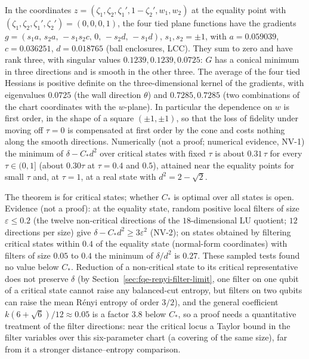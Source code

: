\begin{remark}\label{rem:fqe-critical-structure}
In the coordinates $z=(\zeta_1,\zeta_2,\zeta_1',1-\zeta_2',w_1,w_2)$ at the equality point with $(\zeta_1,\zeta_2,\zeta_1',\zeta_2')=(0,0,0,1)$, the four tied
plane functions have the gradients $g=(s_1a,\,s_2a,\,-s_1s_2c,\,0,\,-s_2d,\,-s_1d)$, $s_1,s_2=\pm1$, with
$a=0.059039$, $c=0.036251$, $d=0.018765$ (ball enclosures, LCC).  They sum to zero and have rank three, with singular values
$0.1239,0.1239,0.0725$: $G$ has a conical minimum in three directions and is smooth in the other three.  The average of the
four tied Hessians is positive definite on the three-dimensional kernel of the gradients, with eigenvalues
$0.0725$ (the wall direction $\theta$) and $0.7285,0.7285$ (two combinations of the chart coordinates with the $w$-plane).
In particular the dependence on $w$ is first order, in the shape of a square $(\pm1,\pm1)$, so that the loss of
fidelity under moving off $\tau=0$ is compensated at first order by the cone and costs nothing along the smooth directions.
Numerically (not a proof; numerical evidence, NV-1) the minimum of $\delta-C_*d^2$ over critical states with fixed
$\tau$ is about $0.31\,\tau$ for every $\tau\in(0,1]$ (about $0.30\tau$ at $\tau=0.4$ and $0.5$), attained near the equality points for small $\tau$ and,
at $\tau=1$, at a real state with $d^2=2-\sqrt2$.
\end{remark}

\begin{remark}\label{rem:fqe-critical-noncritical}
The theorem is for critical states; whether $C_*$ is optimal over all states is open.  Evidence (not a proof):
at the equality state, random positive local filters of size $\varepsilon\le0.2$ (the twelve non-critical directions of the
$18$-dimensional LU quotient; $12$ directions per size) give $\delta-C_*d^2\ge3\varepsilon^2$ (NV-2); on states obtained by filtering critical states within $0.4$ of the equality state
(normal-form coordinates) with filters of size $0.05$ to $0.4$ the minimum of $\delta/d^2$ is $0.27$.
These sampled tests found no value below $C_*$. Reduction of a non-critical state to its critical representative does not preserve
$\delta$ (by Section~\ref{sec:fqe-renyi-filter-limit}, one filter on one qubit of a critical state cannot raise any
balanced-cut entropy, but filters on two qubits can raise the mean R\'enyi entropy of order $3/2$), and the general coefficient $k(6+\sqrt6)/12\approx0.05$ is a factor $3.8$ below
$C_*$, so a proof needs a quantitative treatment of the filter directions: near the critical locus a Taylor bound in the filter
variables over this six-parameter chart (a covering of the same size), far from it a stronger distance--entropy comparison.
\end{remark}
